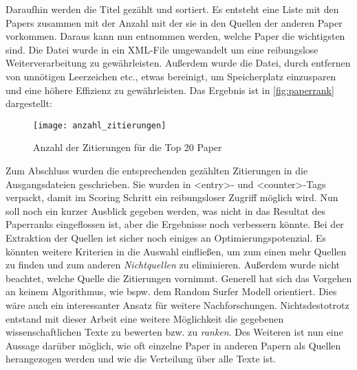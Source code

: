Daraufhin werden die Titel gezählt und sortiert. Es entsteht eine Liste mit den Papers zusammen mit der Anzahl mit der sie in den Quellen der anderen Paper vorkommen. Daraus kann nun entnommen werden, welche Paper die wichtigsten sind. Die Datei wurde in ein XML-File umgewandelt um eine reibungslose Weiterverarbeitung zu gewährleisten. Außerdem wurde die Datei, durch entfernen von unnötigen Leerzeichen etc., etwas bereinigt, um Speicherplatz einzusparen und eine höhere Effizienz zu gewährleisten. Das Ergebnis ist in \autoref{fig:paperrank} dargestellt:




\begin{figure}[ht]

    \texttt{[image: anzahl\_zitierungen]}
  \caption[]{Anzahl der Zitierungen für die Top 20 Paper}
\label{fig:paperrank}
\end{figure}



Zum Abschluss wurden die entsprechenden gezählten Zitierungen in die Ausgangsdateien geschrieben. Sie wurden in <entry>- und <counter>-Tags verpackt, damit im Scoring Schritt ein reibungsloser Zugriff möglich wird.
Nun soll noch ein kurzer Ausblick gegeben werden, was nicht in das Resultat des Paperranks eingeflossen ist, aber die Ergebnisse noch verbessern könnte. Bei der Extraktion der Quellen ist sicher noch einiges an Optimierungspotenzial. Es könnten weitere Kriterien in die Auswahl einfließen, um zum einen mehr Quellen zu finden und zum anderen \emph{Nichtquellen} zu eliminieren. Außerdem wurde nicht beachtet, welche Quelle die Zitierungen vornimmt. Generell hat sich das Vorgehen an keinem Algorithmus, wie bspw. dem Random Surfer Modell orientiert. Dies wäre auch ein interessanter Ansatz für weitere Nachforschungen. 
Nichtsdestotrotz entstand mit dieser Arbeit eine weitere Möglichkeit die gegebenen wissenschaftlichen Texte zu bewerten bzw. zu \emph{ranken}. Des Weiteren ist nun eine Aussage darüber möglich, wie oft einzelne Paper in anderen Papern als Quellen herangezogen werden und wie die  Verteilung über alle Texte ist.



